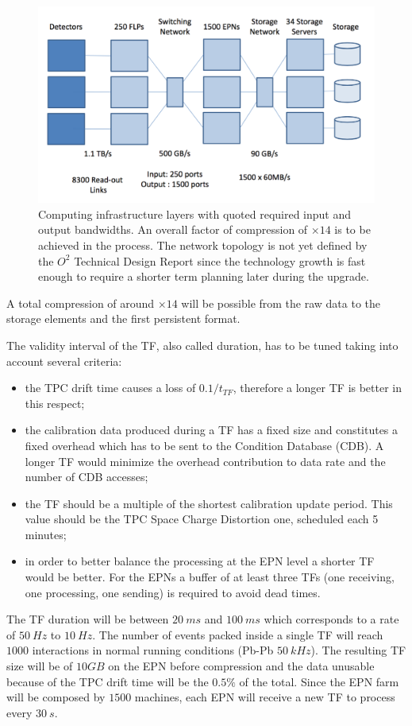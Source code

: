 
\begin{figure}[!ht]
\begin{center}
\includegraphics[width=0.75\linewidth]{Chapters/O2/Figs/Compression.pdf}
\caption{Computing infrastructure layers with quoted required input and output bandwidths. An overall factor of compression of $\times14$ is to be achieved in the process. The network topology is not yet defined by the $O^2$ Technical Design Report since the technology growth is fast enough to require a shorter term planning later during the upgrade.}
\label{fig:O2_TF}
\end{center}
\end{figure}

A total compression of around $\times14$ will be possible from the raw data to the storage elements and the first persistent format.

The validity interval of the TF, also called duration, has to be tuned taking into account several criteria:
\begin{itemize}
    \item the TPC drift time causes a loss of $0.1/t_{TF}$, therefore a longer TF is better in this respect;
    \item the calibration data produced during a TF has a fixed size and constitutes a fixed overhead which has to be sent to the Condition Database (CDB). A longer TF would minimize the overhead contribution to data rate and the number of CDB accesses;
    \item the TF should be a multiple of the shortest calibration update period. This value should be the TPC Space Charge Distortion one, scheduled each 5 minutes;
    \item in order to better balance the processing at the EPN level a shorter TF would be better. For the EPNs a buffer of at least three TFs (one receiving, one processing, one sending) is required to avoid dead times.
\end{itemize}
The TF duration will be between $20\ ms$ and $100\ ms$ which corresponds to a rate of $50\ Hz$ to $10\ Hz$.
The number of events packed inside a single TF will reach $1000$ interactions in normal running conditions (Pb-Pb $50\ kHz$).
The resulting TF size will be of $10GB$ on the EPN before compression and the data unusable because of the TPC drift time will be the $0.5\%$ of the total.
Since the EPN farm will be composed by $1500$ machines, each EPN will receive a new TF to process every $30\ s$.


